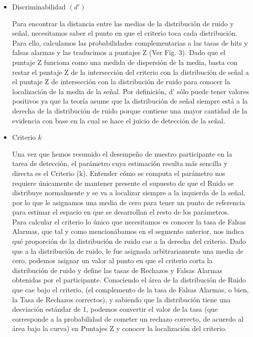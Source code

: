 \begin{itemize}
\item Discriminabilidad $(d')$



Para encontrar la distancia entre las medias de la distribución de ruido y señal, necesitamos saber el punto en que el criterio toca cada distribución. Para ello, calculamos las probabilidades complementarias a las tasas de hits y falsas alarmas y las traducimos a puntajes Z (Ver Fig. 3). Dado que el puntaje Z funciona como una medida de dispersión de la media, basta con restar el puntaje Z de la intersección del criterio con la distribución de señal a el puntaje Z de intersección con la distribución de ruido para conocer la localización de la media de la señal. Por definición, d’ sólo puede tener valores positivos ya que la teoría asume que la distribución de señal siempre está a la derecha de la distribución de ruido porque contiene una mayor cantidad de la evidencia con base en la cual se hace el juicio de detección de la señal.



\item Criterio  $k$

Una vez que hemos resumido el desempeño de nuestro participante en la tarea de detección, el parámetro cuya estimación resulta más sencilla y directa es el Criterio (k). Entender cómo se computa el parámetro nos requiere únicamente de mantener presente el supuesto de que el Ruido se distribuye normalmente y se va a localizar siempre a la izquierda de la señal, por lo que le asignamos una media de cero para tener un punto de referencia para estimar el espacio en que se desarrollan el resto de los parámetros. \\

Para calcular el criterio lo único que necesitamos es conocer la tasa de Falsas Alarmas, que tal y como mencionábamos en el segmento anterior, nos indica qué proporción de la distribución de ruido cae a la derecha del criterio. Dado que a la distribución de ruido, le fue asignada arbitrariamente una media de cero, podemos asignar un valor al punto en que el criterio corta la distribución de ruido y define las tasas de Rechazos y Falsas Alarmas obtenidas por el participante. Conociendo el área de la distribución de Ruido que cae bajo el criterio, (el complemento de la tasa de Falsas Alarmas, o bien, la Tasa de Rechazos correctos), y sabiendo que la distribución tiene una desviación estándar de 1, podemos convertir el valor de la tasa (que corresponde a la probabilidad de cometer un rechazo correcto, de acuerdo al área bajo la curva) en Puntajes Z y conocer la localización del criterio.\\


\end{itemize}

